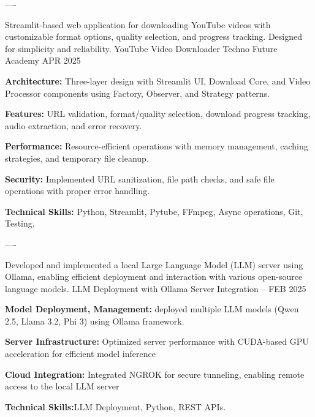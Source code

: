 \begin{cventries}
    \begin{singlespace}
----
\end{singlespace}

\cventry
    {Streamlit-based web application for downloading YouTube videos with customizable format options, quality selection, and progress tracking. Designed for simplicity and reliability.} %
    {YouTube Video Downloader} %
    {Techno Future Academy} %
    {APR 2025} %
    {
      \begin{cvitems} %
        \item \textbf{Architecture:}{ Three-layer design with Streamlit UI, Download Core, and Video Processor components using Factory, Observer, and Strategy patterns.}
        \item \textbf{Features:}{ URL validation, format/quality selection, download progress tracking, audio extraction, and error recovery.}
        \item \textbf{Performance:}{ Resource-efficient operations with memory management, caching strategies, and temporary file cleanup.}
        \item \textbf{Security:}{ Implemented URL sanitization, file path checks, and safe file operations with proper error handling.}
        \item \textbf{Technical Skills:}{ Python, Streamlit, Pytube, FFmpeg, Async operations, Git, Testing.}
      \end{cvitems}
    }
    
    
    \begin{singlespace}
      ----
      \end{singlespace}

      
\cventry
    {Developed and implemented a local Large Language Model (LLM) server using Ollama, enabling efficient deployment and interaction with various open-source language models.} %
    {LLM Deployment with Ollama Server Integration} %
    {--} %
    {FEB 2025} %
    {
      \begin{cvitems} %
        \item \textbf{Model Deployment, Management:}{ deployed multiple LLM models (Qwen 2.5, Llama 3.2, Phi 3) using Ollama framework.}
        \item \textbf{Server Infrastructure:}{ Optimized server performance with CUDA-based GPU acceleration for efficient model inference}
        \item \textbf{Cloud Integration:}{ Integrated NGROK for secure tunneling, enabling remote access to the local LLM server}
        \item \textbf{Technical Skills:}{LLM Deployment, Python, REST APIs.}
      \end{cvitems}
    }
    

\end{cventries}
